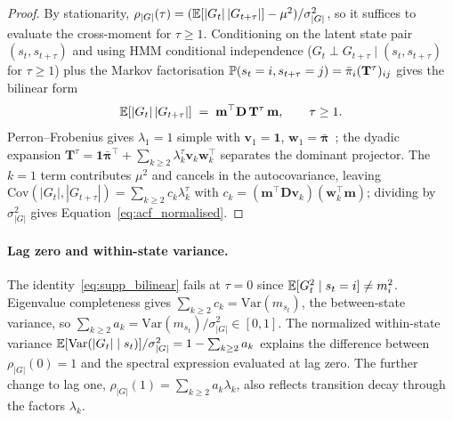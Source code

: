 \begin{proof}
By stationarity, $\rho_{|G|}(\tau) = (\mathbb{E}[|G_t|\,|G_{t+\tau}|] - \mu^2) / \sigma_{|G|}^2$, so it suffices to evaluate the cross-moment for $\tau \ge 1$. Conditioning on the latent state pair $(s_t, s_{t+\tau})$ and using HMM conditional independence ($G_t \perp G_{t+\tau} \mid (s_t, s_{t+\tau})$ for $\tau \ge 1$) plus the Markov factorisation $\mathbb{P}(s_t = i, s_{t+\tau} = j) = \bar\pi_i (\mathbf T^\tau)_{ij}$ gives the bilinear form
\begin{equation}
    \mathbb{E}[|G_t|\,|G_{t+\tau}|] \;=\; \mathbf m^\top \mathbf D\, \mathbf T^\tau\, \mathbf m, \qquad \tau \ge 1.
    \label{eq:supp_bilinear}
\end{equation}
Perron--Frobenius gives $\lambda_1 = 1$ simple with $\mathbf v_1 = \mathbf 1$, $\mathbf w_1 = \bar{\boldsymbol\pi}$~\citep{levinperes2017markov}; the dyadic expansion $\mathbf T^\tau = \mathbf 1\bar{\boldsymbol\pi}^\top + \sum_{k \ge 2} \lambda_k^\tau \mathbf v_k \mathbf w_k^\top$ separates the dominant projector. The $k = 1$ term contributes $\mu^2$ and cancels in the autocovariance, leaving $\mathrm{Cov}(|G_t|, |G_{t+\tau}|) = \sum_{k \ge 2} c_k \lambda_k^\tau$ with $c_k = (\mathbf m^\top \mathbf D \mathbf v_k)(\mathbf w_k^\top \mathbf m)$; dividing by $\sigma_{|G|}^2$ gives Equation~\eqref{eq:acf_normalised}.
\end{proof}

\paragraph{Lag zero and within-state variance.}
The identity~\eqref{eq:supp_bilinear} fails at $\tau = 0$ since $\mathbb{E}[G_t^2 \mid s_t = i] \ne m_i^2$. Eigenvalue completeness gives $\sum_{k \ge 2} c_k = \mathrm{Var}(m_{s_t})$, the between-state variance, so $\sum_{k \ge 2} a_k = \mathrm{Var}(m_{s_t}) / \sigma_{|G|}^2 \in [0, 1]$. The normalized within-state variance $\mathbb{E}[\mathrm{Var}(|G_t| \mid s_t)] / \sigma_{|G|}^2 = 1 - \sum_{k \ge 2} a_k$ explains the difference between $\rho_{|G|}(0)=1$ and the spectral expression evaluated at lag zero. The further change to lag one, $\rho_{|G|}(1)=\sum_{k \ge 2}a_k\lambda_k$, also reflects transition decay through the factors $\lambda_k$.

